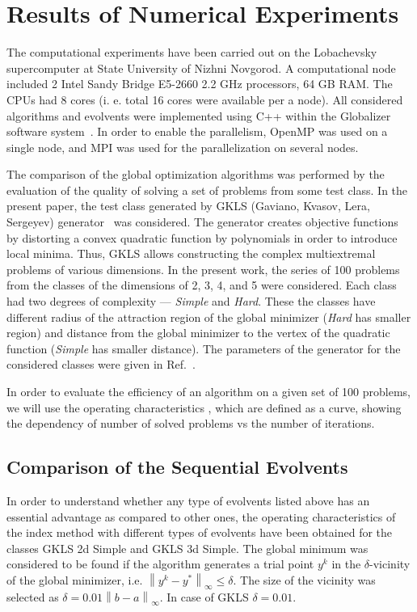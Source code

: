 \documentclass[runningheads]{llncs}
\begin{document}
\section{Results of Numerical Experiments}

The computational experiments have been carried out on the Lobachevsky supercomputer at
State University of Nizhni Novgorod. A computational node included 2 Intel
Sandy Bridge E5-2660 2.2 GHz processors, 64 GB RAM. The CPUs had 8 cores (i. e. total 16
cores were available per a node). All considered algorithms and evolvents were implemented
using C++ within the Globalizer software system~\cite{globalizerSystem}.
In order to enable the parallelism,
OpenMP was used on a single node, and MPI was used for the parallelization on
several nodes.

The comparison of the global optimization algorithms was performed by the evaluation of the
quality of solving a set of problems from some test class.
In the present paper, the test class generated by GKLS (Gaviano, Kvasov, Lera, Sergeyev) generator~\cite{Gaviano2003} was
considered. The generator creates objective functions by distorting a convex quadratic function by polynomials in order to introduce local minima.
Thus, GKLS allows constructing the complex multiextremal problems of various dimensions.
In the present work, the series of 100 problems from the classes of the dimensions
of 2, 3, 4, and 5 were considered.
Each class had two degrees of complexity --- \textit{Simple} and \textit{Hard}. These the classes have different
radius of the attraction region of the global minimizer (\textit{Hard} has smaller region) and distance from the global minimizer to the vertex of the quadratic function (\textit{Simple} has smaller distance).
The parameters of the generator for the considered classes were given in Ref.~\cite{Gaviano2003}.


In order to evaluate the efficiency of an algorithm on a given set of 100 problems, we will use
the operating characteristics \cite{grishaginClass}, which are defined as a
curve, showing the dependency of number of solved problems vs the number of iterations.

\subsection{Comparison of the Sequential Evolvents}
\label{sec:seq_comp}
In order to understand whether any type of evolvents listed above has an essential advantage as
compared to other ones, the operating characteristics of the index method with different types
of evolvents have been obtained for the classes GKLS 2d Simple and GKLS 3d Simple. The
global minimum was considered to be found if the algorithm generates a trial point $y^k$ in the
$\delta$-vicinity of the global minimizer, i.e. $\left\|y^k-y^\ast\right\|_\infty\leq\delta$. The size
of the vicinity was selected as $\delta = 0.01\left\|b-a\right\|_\infty$. In case of GKLS
$\delta=0.01$.
\end{document}

